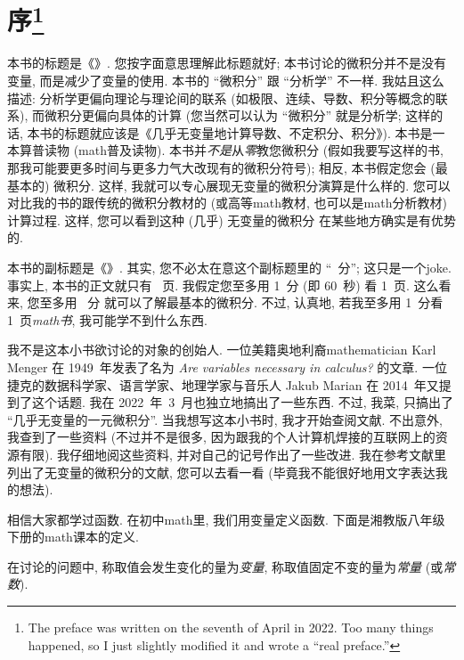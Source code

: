\chapter[序]{序\footnote{The preface was written
      on the seventh of April in 2022.
      Too many things happened,
      so I just slightly modified it
      and wrote a ``real preface.''}}

本书的标题是《\thetitle{}》.
您按字面意思理解此标题就好;
本书讨论的微积分并不是没有变量, 而是减少了变量的使用.
本书的 ``微积分'' 跟 ``分析学'' 不一样.
我姑且这么描述:
分析学更偏向理论与理论间的联系
(如极限、连续、导数、积分等概念的联系),
而微积分更偏向具体的计算
(您当然可以认为 ``微积分'' 就是分析学;
这样的话,
本书的标题就应该是《几乎无变量地计算导数、不定积分、积分》).
本书是一本算普读物 (\gls{math}普及读物).
本书并\emph{不是}从\emph{零}教您微积分
(假如我要写这样的书,
那我可能要更多时间与更多力气大改现有的微积分符号);
相反, 本书假定您会 (最基本的) 微积分.
这样, 我就可以专心展现无变量的微积分演算是什么样的.
您可以对比我的书的跟传统的微积分教材的
(或高等\gls{math}教材, 也可以是\gls{math}分析教材)
计算过程.
这样, 您可以看到这种 (几乎) 无变量的微积分%
在某些地方确实是有优势的.

本书的副标题是《\CalculusSubtitle{}》.
其实, 您不必太在意这个副标题里的
``\pageref{calculus:LastPage}~分'';
这只是一个\gls{joke}.
事实上, 本书的正文就只有 \pageref{calculus:LastPage}~页.
我假定您至多用 1~分 (即 60~秒) 看 1~页.
这么看来, 您至多用 \pageref{calculus:LastPage}~分%
就可以了解最基本的微积分.
不过, 认真地, 若我至多用 1~分看 1~页\emph{\gls{math}书},
我可能学不到什么东西.

我不是这本小书欲讨论的对象的创始人.
一位美籍奥地利裔\gls{mathematician} Karl Menger
在 1949~年发表了名为
\textit{Are variables necessary in calculus?} 的文章.
一位捷克的数据科学家、语言学家、地理学家与音乐人
Jakub Marian 在 2014~年又提到了这个话题.
我在 2022~年~3~月也独立地搞出了一些东西.
不过, 我菜, 只搞出了 ``几乎无变量的一元微积分''.
当我想写这本小书时, 我才开始查阅文献.
不出意外, 我查到了一些资料
(不过并不是很多, 因为跟我的个人计算机焊接的互联网上的资源有限).
我仔细地阅这些资料, 并对自己的记号作出了一些改进.
我在参考文献里列出了无变量的微积分的文献, 您可以去看一看
(毕竟我不能很好地用文字表达我的想法).

相信大家都学过函数.
在初中\gls{math}里, 我们用变量定义函数.
下面是湘教版八年级下册的\gls{math}课本的定义.

\begin{definition*}
    在讨论的问题中,
    称取值会发生变化的量为\emph{变量},
    称取值固定不变的量为\emph{常量} (或\emph{常数}).
\end{definition*}

